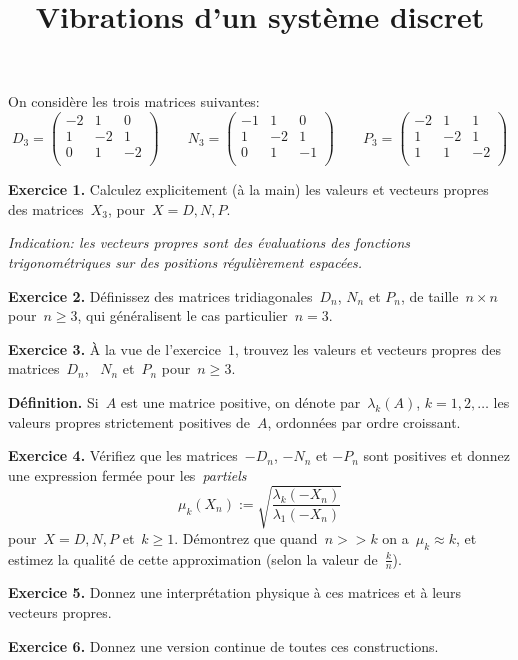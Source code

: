 \title{Vibrations d'un système discret}

On considère les trois matrices suivantes:
\[
	D_3=\begin{pmatrix}
		-2 & 1 & 0 \\
		1 & -2 & 1 \\
		0 & 1 & -2 \\
	\end{pmatrix}
	\qquad
	N_3=\begin{pmatrix}
		-1 & 1 & 0 \\
		1 & -2 & 1 \\
		0 & 1 & -1 \\
	\end{pmatrix}
	\qquad
	P_3=\begin{pmatrix}
		-2 & 1 & 1 \\
		1 & -2 & 1 \\
		1 & 1 & -2 \\
	\end{pmatrix}
\]

{\bf Exercice 1.}
Calculez explicitement (à la main) les valeurs et vecteurs propres des
matrices~$X_3$, pour~$X=D,N,P$.

{\sl Indication: les vecteurs propres sont des évaluations des fonctions
trigonométriques sur des positions régulièrement espacées.}

{\bf Exercice 2.}
Définissez des matrices tridiagonales~$D_n$, $N_n$ et $P_n$, de taille~$n\times
n$ pour~$n\ge 3$, qui généralisent le cas particulier~$n=3$.

{\bf Exercice 3.}
À la vue de l'exercice~$1$, trouvez les valeurs et vecteurs propres des
matrices~$D_n$, ~$N_n$ et~$P_n$ pour~$n\ge 3$.

{\bf Définition.}
Si~$A$ est une matrice positive, on dénote par~$\lambda_k(A)$, $k=1,2,\ldots$
les valeurs propres strictement positives de~$A$, ordonnées par ordre croissant.

{\bf Exercice 4.}
Vérifiez que les matrices~$-D_n$, $-N_n$ et $-P_n$ sont positives et donnez une
expression fermée pour les~\emph{partiels}
\[
	\mu_k(X_n) := \sqrt{\frac{\lambda_k(-X_n)}{\lambda_1(-X_n)}}
\]
pour~$X=D,N,P$ et~$k\ge 1$.  Démontrez que quand~$n>>k$ on a~$\mu_k\approx k$,
et estimez la qualité de cette approximation (selon la valeur de~$\tfrac kn$).

{\bf Exercice 5.}
Donnez une interprétation physique à ces matrices et à leurs vecteurs propres.

{\bf Exercice 6.}
Donnez une version continue de toutes ces constructions.

